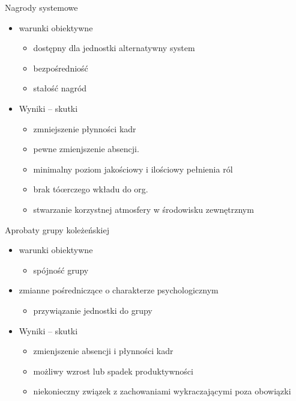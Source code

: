 \documentclass[a4paper,10pt]{report}
\begin{document}
\noindent Nagrody systemowe
\begin{itemize}
	\item warunki obiektywne
	\begin{itemize}
		\item dostępny dla jednostki alternatywny system
		\item bezpośredniość
		\item stałość nagród
	\end{itemize}
	\item Wyniki -- skutki
	\begin{itemize}
		\item zmniejszenie płynności kadr
		\item pewne zmienjszenie absencji. 
		\item minimalny poziom jakościowy i ilościowy pełnienia ról
		\item brak tóœrczego wkładu do org.
		\item  stwarzanie korzystnej atmosfery w środowisku zewnętrznym
	\end{itemize}	
\end{itemize}

\noindent Aprobaty grupy koleżeńskiej
\begin{itemize}
	\item warunki obiektywne
	\begin{itemize}
		\item spójność grupy
	\end{itemize}
	\item zmianne pośredniczące  o charakterze psychologicznym
	\begin{itemize}
		\item przywiązanie jednostki do grupy
	\end{itemize}	
	\item Wyniki -- skutki
	\begin{itemize}
		\item zmienjszenie absencji i płynności kadr
		\item możliwy wzrost lub spadek produktywności
		\item niekonieczny związek z zachowaniami wykraczającymi poza obowiązki
	\end{itemize}	
\end{itemize}
\end{document}
